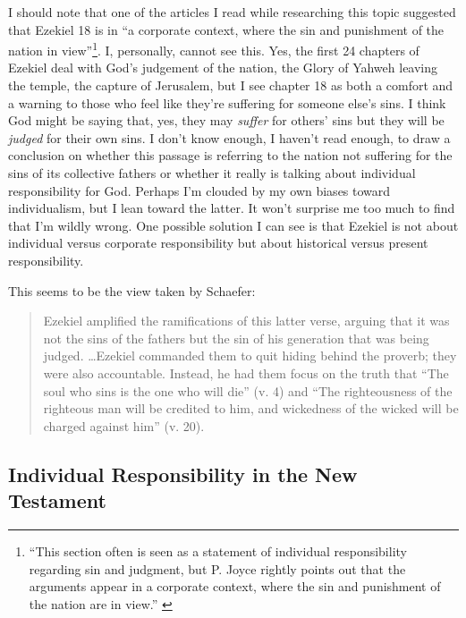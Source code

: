 I should note that one of the articles I read while researching this topic
suggested that Ezekiel 18 is in \enquote{a corporate context, where the sin and
punishment of the nation in view}\footnote{%
\enquote{This section often is seen as a statement of individual
responsibility regarding sin and judgment, but P. Joyce rightly points out
that the arguments appear in a corporate context, where the sin and
punishment of the nation are in view.}
\autocite[470]{hayes:2012}
}. I, personally, cannot see this. Yes, the first 24 chapters of Ezekiel deal
with God's judgement of the nation, the Glory of Yahweh leaving the temple, the
capture of Jerusalem, but I see chapter 18 as both a comfort and a warning to
those who feel like they're suffering for someone else's sins. I think God might
be saying that, yes, they may \emph{suffer} for others' sins but they will be
\emph{judged} for their own sins. I don't know enough, I haven't read enough, to
draw a conclusion on whether this passage is referring to the nation not
suffering for the sins of its collective fathers or whether it really is talking
about individual responsibility for God. Perhaps I'm clouded by my own biases
toward individualism, but I lean toward the latter. It won't surprise me too
much to find that I'm wildly wrong. One possible solution I can see is that
Ezekiel is not about individual versus corporate responsibility but about
historical versus present responsibility.

This seems to be the view taken by Schaefer:

\begin{quote}
    Ezekiel amplified the ramifications of this latter verse, arguing that it
    was not the sins of the fathers but the sin of his generation that was being
    judged. \dots Ezekiel commanded them to quit hiding behind the proverb; they
    were also accountable. Instead, he had them focus on the truth that
    \enquote{The soul who sins is the one who will die} (v. 4) and \enquote{The
    righteousness of the righteous man will be credited to him, and wickedness
    of the wicked will be charged against him} (v. 20).
    \autocite[674]{schaefer:1996}
\end{quote}



\subsection{Individual Responsibility in the New Testament}


